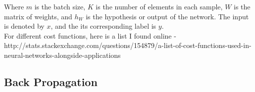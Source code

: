 \documentclass{article}
\begin{document}
Where $m$ is the batch size, $K$ is the number of elements in each sample, $W$ is the matrix of weights, and $h_W$ is the hypothesis or output of the network. The input is denoted by $x$, and the its corresponding label is $y$. \\

For different cost functions, here is a list I found online - http://stats.stackexchange.com/questions/154879/a-list-of-cost-functions-used-in-neural-networks-alongside-applications

\subsection{Back Propagation}
\end{document}
